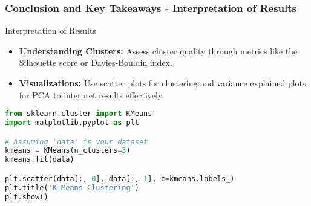 \documentclass[aspectratio=169]{beamer}
\begin{document}
\begin{frame}[fragile]
    \frametitle{Conclusion and Key Takeaways - Interpretation of Results}
    \begin{block}{Interpretation of Results}
        \begin{itemize}
            \item \textbf{Understanding Clusters:} Assess cluster quality through metrics like the Silhouette score or Davies-Bouldin index.
            \item \textbf{Visualizations:} Use scatter plots for clustering and variance explained plots for PCA to interpret results effectively.
        \end{itemize}
    \end{block}
    
    \begin{lstlisting}[language=Python]
from sklearn.cluster import KMeans
import matplotlib.pyplot as plt

# Assuming 'data' is your dataset
kmeans = KMeans(n_clusters=3)
kmeans.fit(data)

plt.scatter(data[:, 0], data[:, 1], c=kmeans.labels_)
plt.title('K-Means Clustering')
plt.show()
    \end{lstlisting}
\end{frame}
\end{document}
